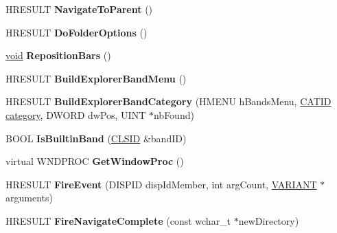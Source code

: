 \begin{DoxyCompactItemize}
\item 
\mbox{\label{class_c_shell_browser_a709dca6c915bcd55999afbdfc9431eb6}} 
H\+R\+E\+S\+U\+LT {\bfseries Navigate\+To\+Parent} ()
\item 
\mbox{\label{class_c_shell_browser_aafaa8e0ee541a83f38a8adf8b2d3aff3}} 
H\+R\+E\+S\+U\+LT {\bfseries Do\+Folder\+Options} ()
\item 
\mbox{\label{class_c_shell_browser_a67c7a01b0a2df2b092082d35f347d407}} 
\hyperlink{interfacevoid}{void} {\bfseries Reposition\+Bars} ()
\item 
\mbox{\label{class_c_shell_browser_a37f996e87b32d9e5c8ad8b2a71c34544}} 
H\+R\+E\+S\+U\+LT {\bfseries Build\+Explorer\+Band\+Menu} ()
\item 
\mbox{\label{class_c_shell_browser_ad0858fab687937d5dd3a8e68d48a6843}} 
H\+R\+E\+S\+U\+LT {\bfseries Build\+Explorer\+Band\+Category} (H\+M\+E\+NU h\+Bands\+Menu, \hyperlink{interface_g_u_i_d}{C\+A\+T\+ID} \hyperlink{structcategory}{category}, D\+W\+O\+RD dw\+Pos, U\+I\+NT $\ast$nb\+Found)
\item 
\mbox{\label{class_c_shell_browser_a0c49be53bd557576c2189bec5648fb9a}} 
B\+O\+OL {\bfseries Is\+Builtin\+Band} (\hyperlink{struct___i_i_d}{C\+L\+S\+ID} \&band\+ID)
\item 
\mbox{\label{class_c_shell_browser_a04801f00b8b8b92fa0bf0d8bb967b6fc}} 
virtual W\+N\+D\+P\+R\+OC {\bfseries Get\+Window\+Proc} ()
\item 
\mbox{\label{class_c_shell_browser_ac08d8aadf2bed869bd88145167313f84}} 
H\+R\+E\+S\+U\+LT {\bfseries Fire\+Event} (D\+I\+S\+P\+ID disp\+Id\+Member, int arg\+Count, \hyperlink{structtag_v_a_r_i_a_n_t}{V\+A\+R\+I\+A\+NT} $\ast$arguments)
\item 
\mbox{\label{class_c_shell_browser_a3e36940e089755f9a64f4274b69eb2ce}} 
H\+R\+E\+S\+U\+LT {\bfseries Fire\+Navigate\+Complete} (const wchar\+\_\+t $\ast$new\+Directory)
\item 

\end{DoxyCompactItemize}
